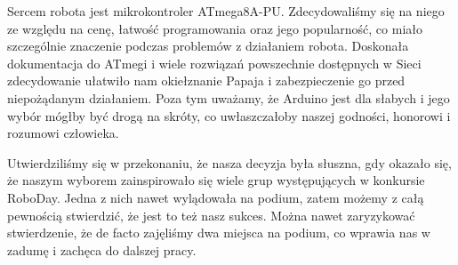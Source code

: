 Sercem robota jest mikrokontroler ATmega8A-PU. Zdecydowaliśmy się na niego ze względu na cenę, łatwość programowania oraz jego popularność, co miało szczególnie znaczenie podczas problemów z działaniem robota. Doskonała dokumentacja do ATmegi i wiele rozwiązań powszechnie dostępnych w Sieci zdecydowanie ułatwiło nam okiełznanie Papaja i zabezpieczenie go przed niepożądanym działaniem. Poza tym uważamy, że Arduino jest dla słabych i jego wybór mógłby być drogą na skróty, co uwłaszczałoby naszej godności, honorowi i rozumowi człowieka.

Utwierdziliśmy się w przekonaniu, że nasza decyzja była słuszna, gdy okazało się, że naszym wyborem zainspirowało się wiele grup występujących w konkursie RoboDay. Jedna z nich nawet wylądowała na podium, zatem możemy z całą pewnością stwierdzić, że jest to też nasz sukces. Można nawet zaryzykować stwierdzenie, że de facto zajęliśmy dwa miejsca na podium, co wprawia nas w zadumę i zachęca do dalszej pracy.


